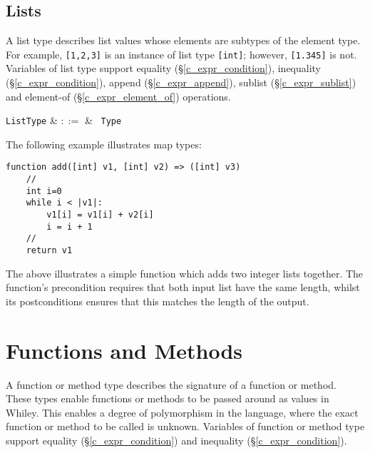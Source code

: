 
\subsection{Lists}
\label{c_types_list}

A list type describes list values whose elements are subtypes of the element type. For example, \lstinline{[1,2,3]} is an instance of list type \lstinline{[int]}; however, \lstinline{[1.345]} is not.  Variables of list type support equality (\S\ref{c_expr_condition}), inequality (\S\ref{c_expr_condition}), append (\S\ref{c_expr_append}), sublist (\S\ref{c_expr_sublist}) and element-of (\S\ref{c_expr_element_of}) operations.

\begin{syntax}
  \verb+ListType+ & $::=$ & \token{[} \ \verb+Type+ \ \token{]}\\
\end{syntax}

\noindent The following example illustrates map types:

\begin{lstlisting}
function add([int] v1, [int] v2) => ([int] v3)
    //
    int i=0
    while i < |v1|:
        v1[i] = v1[i] + v2[i]
        i = i + 1 
    //
    return v1
\end{lstlisting}

The above illustrates a simple function which adds two integer lists together.  The function's \gls{precondition} requires that both input list have the same length, whilst its \gls{postcondition}s ensures that this matches the length of the output.


\section{Functions and Methods}
A function or method type describes the signature of a function or method.  These types enable functions or methods to be passed around as values in Whiley.  This enables a degree of polymorphism in the language, where the exact function or method to be called is unknown.   Variables of function or method type support equality (\S\ref{c_expr_condition}) and inequality (\S\ref{c_expr_condition}).

